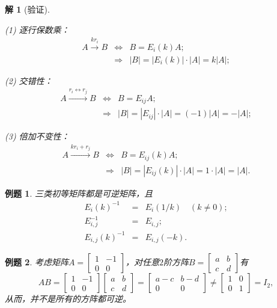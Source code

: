 \documentclass[a4paper]{book}
\newtheorem{eg}{例题}[chapter]
\newtheorem*{solution}{解}
\newcommand{\enum}{\begin{list}{}{\setlength{\leftmargin}{0pt} \setlength{\itemindent}{2.5em} \setlength{\listparindent}{2em}}}
\begin{document}
\begin{solution}[验证]\

\enum
\item[(1)] 逐行保数乘：
\begin{eqnarray*}
A \xrightarrow{kr_i} B & \Longleftrightarrow & B = E_i(k)A; \\
& \Longrightarrow & |B| = |E_i(k)|\cdot|A| = k|A|;
\end{eqnarray*}
\item[(2)] 交错性：
\begin{eqnarray*}
A \xrightarrow{r_i\leftrightarrow r_j} B & \Longleftrightarrow & B = E_{ij}A; \\
& \Longrightarrow & |B| = |E_{ij}|\cdot|A| = (-1)|A| = -|A|;
\end{eqnarray*}
\item[(3)] 倍加不变性：
\begin{eqnarray*}
A \xrightarrow{kr_i + r_j} B & \Longleftrightarrow & B = E_{ij}(k)A; \\
& \Longrightarrow & |B| = |E_{ij}(k)|\cdot|A| = 1\cdot|A| = |A|.
\end{eqnarray*}
\end{list}
\end{solution}

\begin{eg}
三类初等矩阵都是可逆矩阵，且
\begin{eqnarray*}
E_i(k)^{-1} & = & E_i(1/k) \quad (k\neq 0); \\
E_{i,j}^{-1} & = & E_{i,j}; \\
E_{i,j}(k)^{-1} & = & E_{i,j}(-k).
\end{eqnarray*}
\end{eg}

\begin{eg}
考虑矩阵$A = \begin{bmatrix} 1 & -1 \\ 0 & 0 \end{bmatrix}$，对任意$2$阶方阵$B= \begin{bmatrix} a & b \\ c & d \end{bmatrix}$有
$$AB = \begin{bmatrix} 1 & -1 \\ 0 & 0 \end{bmatrix} \begin{bmatrix} a & b \\ c & d \end{bmatrix} = \begin{bmatrix} a-c & b-d \\ 0 & 0 \end{bmatrix} \neq \begin{bmatrix} 1 & 0 \\ 0 & 1 \end{bmatrix} = I_2,$$
从而，并不是所有的方阵都可逆。
\end{eg}
\end{document}
